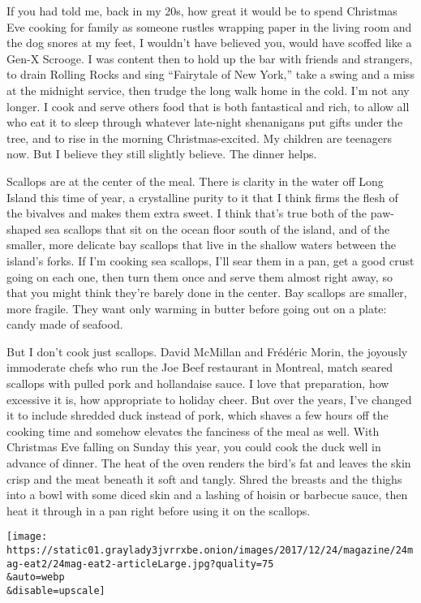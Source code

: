 If you had told me, back in my 20s, how great it would be to spend
Christmas Eve cooking for family as someone rustles wrapping paper in
the living room and the dog snores at my feet, I wouldn't have believed
you, would have scoffed like a Gen-X Scrooge. I was content then to hold
up the bar with friends and strangers, to drain Rolling Rocks and sing
``Fairytale of New York,'' take a swing and a miss at the midnight
service, then trudge the long walk home in the cold. I'm not any longer.
I cook and serve others food that is both fantastical and rich, to allow
all who eat it to sleep through whatever late-night shenanigans put
gifts under the tree, and to rise in the morning Christmas-excited. My
children are teenagers now. But I believe they still slightly believe.
The dinner helps.

Scallops are at the center of the meal. There is clarity in the water
off Long Island this time of year, a crystalline purity to it that I
think firms the flesh of the bivalves and makes them extra sweet. I
think that's true both of the paw-shaped sea scallops that sit on the
ocean floor south of the island, and of the smaller, more delicate bay
scallops that live in the shallow waters between the island's forks. If
I'm cooking sea scallops, I'll sear them in a pan, get a good crust
going on each one, then turn them once and serve them almost right away,
so that you might think they're barely done in the center. Bay scallops
are smaller, more fragile. They want only warming in butter before going
out on a plate: candy made of seafood.

But I don't cook just scallops. David McMillan and Frédéric Morin, the
joyously immoderate chefs who run the Joe Beef restaurant in Montreal,
match seared scallops with pulled pork and hollandaise sauce. I love
that preparation, how excessive it is, how appropriate to holiday cheer.
But over the years, I've changed it to include shredded duck instead of
pork, which shaves a few hours off the cooking time and somehow elevates
the fanciness of the meal as well. With Christmas Eve falling on Sunday
this year, you could cook the duck well in advance of dinner. The heat
of the oven renders the bird's fat and leaves the skin crisp and the
meat beneath it soft and tangly. Shred the breasts and the thighs into a
bowl with some diced skin and a lashing of hoisin or barbecue sauce,
then heat it through in a pan right before using it on the scallops.

\texttt{[image: https://static01.graylady3jvrrxbe.onion/images/2017/12/24/magazine/24mag-eat2/24mag-eat2-articleLarge.jpg?quality=75\\\&auto=webp\\\&disable=upscale]}

